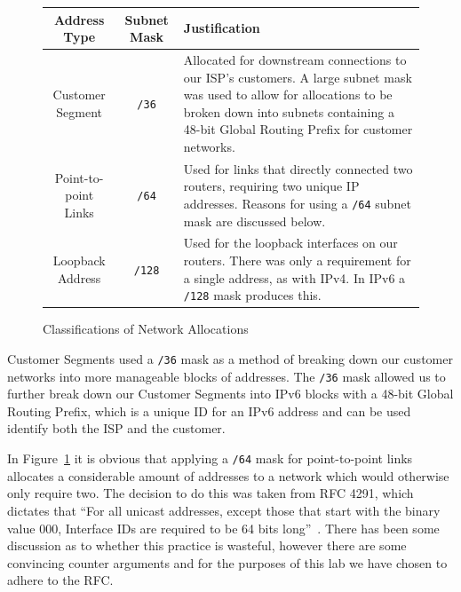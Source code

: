 \begin{figure}[!ht]
    \caption{Classifications of Network Allocations}
    \label{figure:network-alloc-3}
    \centering
    \begin{tabular}{|c|c|p{5.5cm}|}

        \hline \textbf{Address Type} & \textbf{Subnet Mask} & \textbf{Justification} \\

        \hline
        Customer Segment & \texttt{/36} & Allocated for downstream connections
        to our ISP's customers. A large subnet mask was used to allow for
        allocations to be broken down into subnets containing a 48-bit Global
        Routing Prefix for customer networks.\\

        \hline
        Point-to-point Links & \texttt{/64} & Used for links that directly
        connected two routers, requiring two unique IP addresses. Reasons for
        using a \texttt{/64} subnet mask are discussed below.\\
        \hline
        Loopback Address & \texttt{/128} & Used for the loopback interfaces on
        our routers. There was only a requirement for a single address, as with
        IPv4. In IPv6 a \texttt{/128} mask produces this.\\

        \hline
    \end{tabular}
\end{figure}

Customer Segments used a \texttt{/36} mask as a method of breaking down our
customer networks into more manageable blocks of addresses. The \texttt{/36}
mask allowed us to further break down our Customer Segments into IPv6 blocks
with a 48-bit Global Routing Prefix, which is a unique ID for an IPv6 address
and can be used identify both the ISP and the customer.

In Figure~\ref{figure:network-alloc-3} it is obvious that applying a
\texttt{/64} mask for point-to-point links allocates a considerable amount of
addresses to a network which would otherwise only require two. The decision to
do this was taken from RFC 4291, which dictates that ``For all unicast
addresses, except those that start with the binary value 000, Interface IDs are
required to be 64 bits long''~\cite{rfc4291}. There has been some discussion as
to whether this practice is wasteful\cite{ipv6waste}, however there are
some convincing counter arguments\cite{ipv6notwaste} and for the purposes of
this lab we have chosen to adhere to the RFC.
